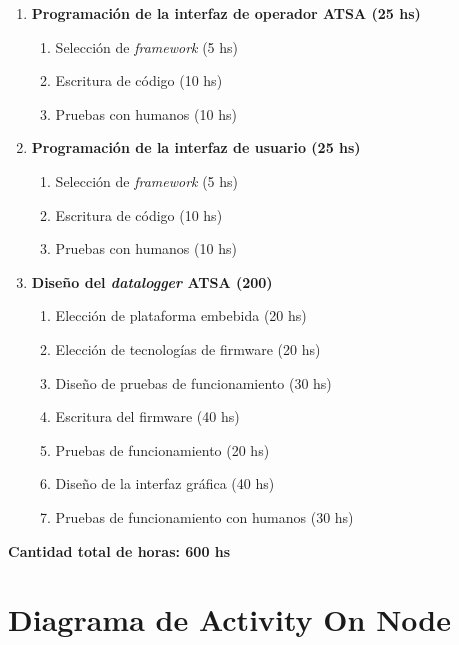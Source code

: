 \documentclass[
12pt,
spanish,
singlespacing,
parskip,
headsepline,]{article}
\begin{document}
\begin{enumerate}
\begin{enumerate}
	\end{enumerate}
	\item \textbf{Programación de la interfaz de operador ATSA (25 hs)}
	\begin{enumerate}
		\item Selección de \emph{framework} (5 hs)
		\item Escritura de código (10 hs)
		\item Pruebas con humanos (10 hs)
	\end{enumerate}
	\item \textbf{Programación de la interfaz de usuario (25 hs)}
	\begin{enumerate}
		\item Selección de \emph{framework} (5 hs)
		\item Escritura de código (10 hs)
		\item Pruebas con humanos (10 hs)
	\end{enumerate}
	\item \textbf{Diseño del \emph{datalogger} ATSA (200)}
	\begin{enumerate}
		\item Elección de plataforma embebida (20 hs)
		\item Elección de tecnologías de firmware (20 hs)
		\item Diseño de pruebas de funcionamiento (30 hs)
		\item Escritura del firmware (40 hs)
		\item Pruebas de funcionamiento (20 hs)
		\item Diseño de la interfaz gráfica (40 hs)
		\item Pruebas de funcionamiento con humanos (30 hs)
	\end{enumerate}
\end{enumerate}

\textbf{Cantidad total de horas: 600 hs}

\section{Diagrama de Activity On Node}
\end{document}
